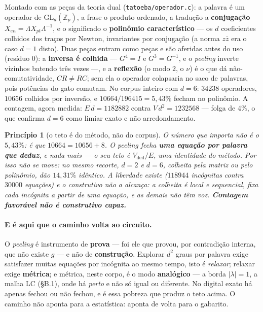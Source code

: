 \documentclass[11pt]{article}
\newcommand{\code}[1]{\texttt{\small #1}}
\newcommand{\Z}{\mathbb Z}
\theoremstyle{plain}
\newtheorem{principio}{Princípio}
\theoremstyle{remark}
\begin{document}
Montado com as peças da teoria dual (\code{tatoeba/operador.c}): a palavra é um operador de
$\mathrm{GL}_d(\Z_p)$, a frase o produto ordenado, a tradução a \textbf{conjugação}
$X_{en}=\Lambda X_{pt}\Lambda^{-1}$, e o significado o \textbf{polinômio característico} --- os $d$
coeficientes colhidos dos traços por Newton, invariantes por conjugação (a norma $z\bar z$ era o caso
$d=1$ disto). Duas peças entram como peças e são aferidas antes do uso (resíduo $0$): a \textbf{inversa
é colhida} --- $G^4=I$ e $G^3=G^{-1}$, e o \emph{peeling} inverte vizinhos batendo três vezes ---, e a
\textbf{reflexão} (o modo $2$, o $\nu$) é o que dá não-comutatividade, $CR\neq RC$; sem ela o operador
colapsaria no saco de palavras, pois potências do gato comutam. No corpus inteiro com $d=6$: $34238$
operadores, $10656$ colhidos por inversão, e $10664/196415=5{,}43\%$ fecham no polinômio. A contagem,
agora medida: $E\,d=1182882$ contra $V\,d^2=1232568$ --- folga de $4\%$, o que confirma $d=6$ como
limiar exato e não arredondamento.

\begin{principio}[o teto é do método, não do corpus]
O número que importa não é o $5{,}43\%$: é que $10664=10656+8$. O \emph{peeling} fecha \textbf{uma
equação por palavra que deduz}, e nada mais --- o seu teto é $V_{\text{ded}}/E$, uma identidade do
método. Por isso não se move: no mesmo recorte, $d=2$ e $d=6$, colheita pela matriz ou pelo polinômio,
dão $14{,}31\%$ \emph{idêntico}. A liberdade existe ($118944$ incógnitas contra $30000$ equações) e o
construtivo não a alcança: a colheita é local e sequencial, fixa cada incógnita a partir de \emph{uma}
equação, e as demais não têm voz. \textbf{Contagem favorável não é construtivo capaz.}
\end{principio}

\paragraph{E é aqui que o caminho volta ao circuito.} O \emph{peeling} é instrumento de \textbf{prova}
--- foi ele que provou, por contradição interna, que não existe $g$ --- e não de \textbf{construção}.
Explorar $d^2$ graus por palavra exige satisfazer muitas equações por incógnita ao mesmo tempo, isto é
\emph{relaxar}; relaxar exige \textbf{métrica}; e métrica, neste corpo, é o modo \textbf{analógico} ---
a borda $|\lambda|=1$, a malha LC (§B.1), onde há \emph{perto} e não só igual ou diferente. No digital
exato há apenas fechou ou não fechou, e é essa pobreza que produz o teto acima. O caminho não aponta
para a estatística: aponta de volta para o gabarito.
\end{document}
